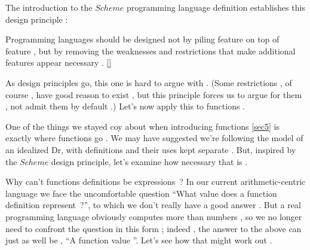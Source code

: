 \secdown

The introduction to the  $Scheme$
programming language definition establishes this design principle :
\begin{framed}
Programming languages  should be designed  not by piling feature on top of feature , but by removing the weaknesses and restrictions  that make additional features appear
necessary .
\ref{}
\end{framed}
As design principles go, this one is hard to argue with . (Some restrictions , of course
, have good reason to exist , but this principle forces us to argue for them , not admit them by default .) Let’s now apply this to functions .

One of the things  we stayed coy about  when introducing functions 
\ref{sec5} is exactly where functions go .
We may have suggested we’re following the model  of an idealized  Dr\racket, with definitions and
their uses kept separate . But, inspired by the  $Scheme$
design principle, let’s examine how necessary that is .

Why can’t functions definitions be expressions \,? In our current arithmetic-centric language  we face the uncomfortable question  ``What value does a function definition
represent \,?'',
to which we don’t really have a good answer . But a real programming language  obviously computes more than numbers , so we no longer need  to
confront the question in this form ; indeed , the answer to the above can just as well
be , ``A function value ''.
Let’s see how that might work out .

